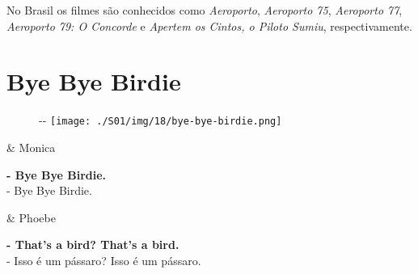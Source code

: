 No Brasil os filmes são conhecidos como \emph{Aeroporto},
\emph{Aeroporto 75}, \emph{Aeroporto 77}, \emph{Aeroporto 79: O
Concorde} e \emph{Apertem os Cintos, o Piloto Sumiu}, respectivamente.

\hypertarget{bye-bye-birdie}{%
\section{Bye Bye Birdie}\label{bye-bye-birdie}}

\begin{figure}[!ht]
  \begin{adjustwidth}{-\oddsidemargin-1in}{-\rightmargin}
    \centering
    \texttt{[image: ./S01/img/18/bye-bye-birdie.png]}
  \end{adjustwidth}
\end{figure}

\begin{tcolorbox}[enhanced,center upper,
    drop fuzzy shadow southeast, boxrule=0.3pt,
    lower separated=false, breakable,
    colframe=black!30!dialogoBorder,colback=white]
\begin{minipage}[c]{0.16\linewidth}
   & \centering \scriptsize{Monica}
\end{minipage}
\hfill
\begin{minipage}[c]{0.8\linewidth}
  \textbf{- Bye Bye Birdie.}\\
  - Bye Bye Birdie.
\end{minipage}

\medskip
\begin{minipage}[c]{0.16\linewidth}
   & \centering \scriptsize{Phoebe}
\end{minipage}
\hfill
\begin{minipage}[c]{0.8\linewidth}
  \textbf{- That's a bird? That's a bird.}\\
  - Isso é um pássaro? Isso é um pássaro.
\end{minipage}
\end{tcolorbox}

